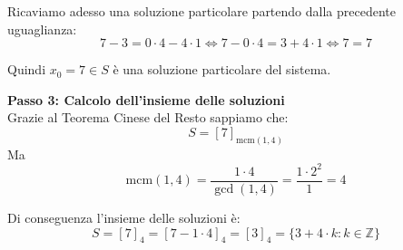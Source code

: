 \documentclass[12pt]{article}
\begin{document}
Ricaviamo adesso una soluzione particolare partendo dalla precedente uguaglianza:
$$7 - 3 = 0 \cdot 4 - 4 \cdot 1 \iff 7 - 0 \cdot 4 = 3 + 4 \cdot 1 \iff 7 = 7$$

Quindi $x_0 = 7 \in S$ è una soluzione particolare del sistema.


\textbf{Passo 3: Calcolo dell'insieme delle soluzioni} \\ 
Grazie al Teorema Cinese del Resto sappiamo che:
$$S = [7]_{\mathrm{mcm}(1, 4)}$$
Ma
$$\mathrm{mcm}({1}, {4}) = \frac{{1} \cdot {4}}{\gcd({1},{4})} = \frac{{1} \cdot {2^{2}}}{1} = {4}$$

Di conseguenza l'insieme delle soluzioni è:
        $$S = [7]_{4} = [7 - 1 \cdot 4]_{4} = [3]_{4} = \{3 + 4 \cdot k : k \in \mathbb{Z}\}$$
        
\end{document}
